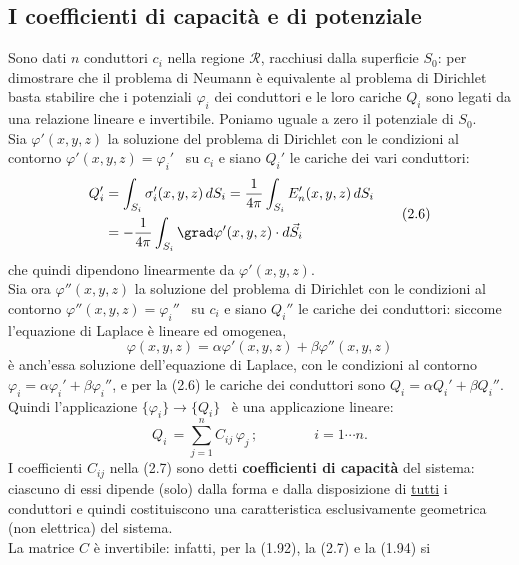\subsection{I coefficienti di capacit\`a e di potenziale}

Sono dati $n$ conduttori $c_i$ nella regione $\mathcal R$, racchiusi dalla
superficie $S_0$: per dimostrare che il problema di Neumann \`e equivalente al
problema di Dirichlet basta stabilire che i potenziali $\varphi_i$ dei
conduttori e le loro cariche $Q_i$ sono legati da una relazione lineare e
invertibile. Poniamo uguale a zero il potenziale di $S_0$.\\
Sia $\varphi'(x,y,z)$ la soluzione del problema di Dirichlet con le condizioni
al contorno $\varphi'(x,y,z)=\varphi_i'$ \ su $c_i$ e siano $Q_i'$ le cariche
dei vari conduttori:
\begin{equation}
  \begin{split}
    Q_i'&=\int_{S_i}\sigma_i'(x,y,z)\,dS_i
    =\frac{1}{4\pi}\int_{S_i}E_n'(x,y,z)\,dS_i\\
    &=-\frac{1}{4\pi}\int_{S_i}\grad\varphi'(x,y,z)\cdot d\vec S_i
  \end{split}
  \tag{2.6}
\end{equation}
che quindi dipendono linearmente da $\varphi'(x,y,z)$.\\
Sia ora $\varphi''(x,y,z)$ la soluzione del problema di Dirichlet con le
condizioni al contorno $\varphi''(x,y,z)=\varphi_i''$ \ su $c_i$ e siano $Q_i''$
le cariche dei conduttori: siccome l'equazione di Laplace \`e lineare ed
omogenea,
\[
  \varphi(x,y,z)=\alpha\varphi'(x,y,z)+\beta\varphi''(x,y,z)
\]
\`e anch'essa soluzione dell'equazione di Laplace, con le condizioni al contorno
\ $\varphi_i=\alpha\varphi_i'+\beta\varphi_i''$, e per la (2.6) le cariche dei
conduttori sono $Q_i=\alpha Q_i'+\beta Q_i''$.\\
Quindi l'applicazione $\{\varphi_i\}\to\{Q_i\}$ \ \`e una applicazione lineare:
\begin{equation}
  Q_i\,=\sum_{j=1}^nC_{ij}\,\varphi_j\,;\qquad\qquad i=1\cdots n.
  \tag{2.7}
\end{equation}
I coefficienti $C_{ij}$ nella (2.7) sono detti \textbf{coefficienti di
capacit\`a} del sistema: ciascuno di essi dipende (solo) dalla forma e dalla
disposizione di \underline{tutti} i conduttori e quindi costituiscono una
caratteristica esclusivamente geometrica (non elettrica) del sistema.\\
La matrice $C$ \`e invertibile: infatti, per la (1.92), la (2.7) e la (1.94) si
